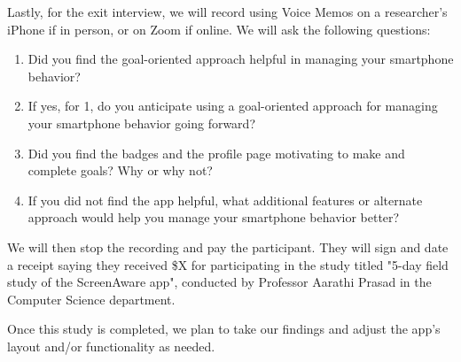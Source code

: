 \documentclass[12pt, title page, manuscript, nonacm]{acmart}
\begin{document}
\par Lastly, for the exit interview, we will record using Voice Memos on a researcher's iPhone if in person, or on Zoom if online. We will ask the following questions\cite{sato2017navcog3}: \begin{enumerate}
    \item Did you find the goal-oriented approach helpful in managing your smartphone behavior?
    \item If yes, for 1, do you anticipate using a goal-oriented approach for managing your smartphone behavior going forward?\cite{park2007acceptance}
    \item Did you find the badges and the profile page motivating to make and complete goals? Why or why not?
    \item If you did not find the app helpful, what additional features or alternate approach would help you manage your smartphone behavior better?
\end{enumerate}
We will then stop the recording and pay the participant. They will sign and date a receipt saying they received \$X for participating in the study titled "5-day field study of the ScreenAware app", conducted by Professor Aarathi Prasad in the Computer Science department.
\par Once this study is completed, we plan to take our findings and adjust the app's layout and/or functionality as needed.
\end{document}
